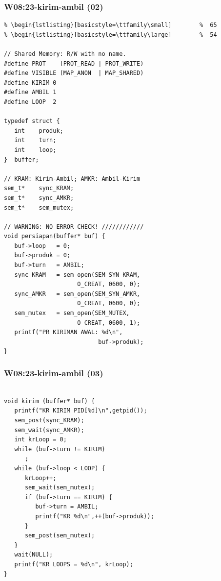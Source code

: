 \documentclass[xcolor=table, notheorems, hyperref={pdfpagelabels=false}]{beamer}
\begin{document}
\begin{frame}[fragile]
\frametitle{W08:23-kirim-ambil (02)}
\begin{lstlisting}[basicstyle=\ttfamily\tiny]         % 108
% \begin{lstlisting}[basicstyle=\ttfamily\footnotesize] %  72
% \begin{lstlisting}[basicstyle=\ttfamily\small]        %  65
% \begin{lstlisting}[basicstyle=\ttfamily\large]        %  54

// Shared Memory: R/W with no name.
#define PROT    (PROT_READ | PROT_WRITE)
#define VISIBLE (MAP_ANON  | MAP_SHARED)
#define KIRIM 0
#define AMBIL 1
#define LOOP  2

typedef struct {
   int    produk;
   int    turn;
   int    loop;
}  buffer;

// KRAM: Kirim-Ambil; AMKR: Ambil-Kirim
sem_t*    sync_KRAM;
sem_t*    sync_AMKR;
sem_t*    sem_mutex;

// WARNING: NO ERROR CHECK! ////////////
void persiapan(buffer* buf) {
   buf->loop   = 0;
   buf->produk = 0;
   buf->turn   = AMBIL;
   sync_KRAM   = sem_open(SEM_SYN_KRAM, 
                     O_CREAT, 0600, 0);
   sync_AMKR   = sem_open(SEM_SYN_AMKR, 
                     O_CREAT, 0600, 0);
   sem_mutex   = sem_open(SEM_MUTEX, 
                     O_CREAT, 0600, 1);
   printf("PR KIRIMAN AWAL: %d\n",
                           buf->produk);
}

\end{lstlisting}
\end{frame}

\begin{frame}[fragile]
\frametitle{W08:23-kirim-ambil (03)}
\begin{lstlisting}[basicstyle=\ttfamily\small]        %  65
% \begin{lstlisting}[basicstyle=\ttfamily\large]        %  54

void kirim (buffer* buf) {
   printf("KR KIRIM PID[%d]\n",getpid());
   sem_post(sync_KRAM);
   sem_wait(sync_AMKR);
   int krLoop = 0;
   while (buf->turn != KIRIM)
      ;
   while (buf->loop < LOOP) {
      krLoop++;
      sem_wait(sem_mutex);
      if (buf->turn == KIRIM) {
         buf->turn = AMBIL;
         printf("KR %d\n",++(buf->produk));
      }
      sem_post(sem_mutex);
   }
   wait(NULL);
   printf("KR LOOPS = %d\n", krLoop);
}

\end{lstlisting}
\end{frame}
\end{document}

